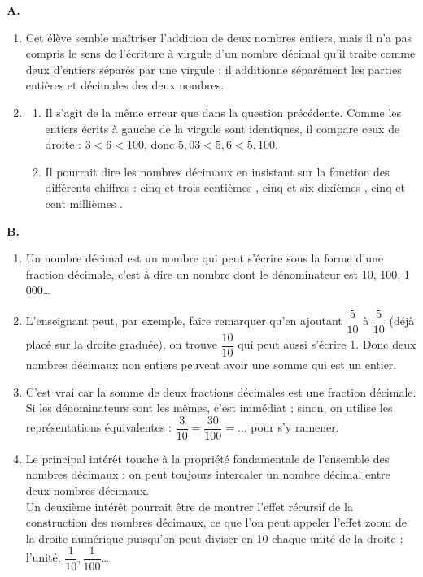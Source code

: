 \begin{corrige}
{\bf A.}
\begin{enumerate}
   \item Cet élève semble maîtriser l'addition de deux nombres entiers, mais il n'a pas compris le sens de l'écriture à virgule d'un nombre décimal qu'il traite comme deux d'entiers séparés par une virgule : il additionne séparément les parties entières et décimales des deux nombres.
   \item 
   \begin{enumerate}
      \item Il s'agit de la même erreur que dans la question précédente. Comme les entiers écrits à gauche de la virgule sont identiques, il compare ceux de droite : $3<6<100$, donc $5,03<5,6<5,100.$
      \item Il pourrait dire les nombres décimaux en insistant sur la fonction des différents chiffres : \og cinq et trois centièmes \fg, \og cinq et six dixièmes \fg{}, \og cinq et cent millièmes \fg.
   \end{enumerate}
\end{enumerate}

\bigskip

{\bf B.}
\begin{enumerate}
   \item Un nombre décimal est un nombre qui peut s'écrire sous la forme d'une fraction décimale, c'est à dire un nombre dont le dénominateur est 10, 100, 1\,000\dots
   \item L'enseignant peut, par exemple, faire remarquer qu'en ajoutant $\dfrac{5}{10}$ à $\dfrac{5}{10}$ (déjà placé sur la droite graduée), on trouve $\dfrac{10}{10}$ qui peut aussi s'écrire 1. Donc deux nombres décimaux non entiers peuvent avoir une somme qui est un entier.
    \item C'est vrai car la somme de deux fractions décimales est une fraction décimale. Si les dénominateurs sont les mêmes, c'est immédiat ; sinon, on utilise les représentations équivalentes : $\dfrac{3}{10}=\dfrac{30}{100}=\dots$ pour s'y ramener.
   \item Le principal intérêt touche à la propriété fondamentale de l'ensemble des nombres décimaux : on peut toujours intercaler un nombre décimal entre deux nombres décimaux. \\
   Un deuxième intérêt pourrait être de montrer l'effet récursif de la construction des nombres décimaux, ce que l'on peut appeler \og l'effet zoom \fg{} de la droite numérique puisqu'on peut diviser en 10 chaque unité de la droite : l'unité, $\dfrac1{10}, \dfrac1{100}$\dots
   \end{enumerate}
\end{corrige}

